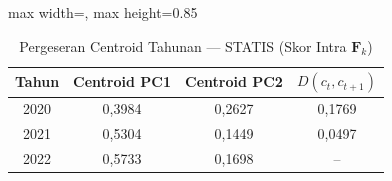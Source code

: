 \begin{table}[H]
\centering
\caption{Pergeseran Centroid Tahunan --- STATIS (Skor Intra $\mathbf{F}_k$)} \label{tab:sample2centroid_statis}
\begin{adjustbox}{max width=\textwidth, max height=0.85\textheight}
\begin{tabular}{|c|c|c|c|}
\hline
\textbf{Tahun} & \textbf{Centroid PC1} & \textbf{Centroid PC2} & \textbf{$D(c_t, c_{t+1})$} \\
\hline
2020 & 0,3984 & 0,2627 & 0,1769 \\
2021 & 0,5304 & 0,1449 & 0,0497 \\
2022 & 0,5733 & 0,1698 & -- \\
\hline
\end{tabular}
\end{adjustbox}
\end{table}